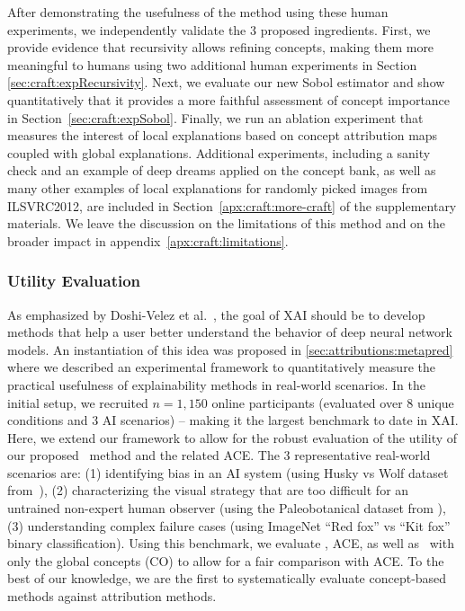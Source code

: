 After demonstrating the usefulness of the method using these human experiments, we independently validate the 3 proposed ingredients.
First, we provide evidence that recursivity allows refining concepts, making them more meaningful to humans using two additional human experiments in Section \ref{sec:craft:expRecursivity}.
Next, we evaluate our new Sobol estimator and show quantitatively that it provides a more faithful assessment of concept importance in Section~\ref{sec:craft:expSobol}.
Finally, we run an ablation experiment that measures the interest of local explanations based on concept attribution maps coupled with global explanations.
Additional experiments, including a sanity check and an example of deep dreams applied on the concept bank, as well as many other examples of local explanations for randomly picked images from ILSVRC2012, are included in Section~\ref{apx:craft:more-craft} of the supplementary materials.
We leave the discussion on the limitations of this method and on the broader impact in appendix~\ref{apx:craft:limitations}.

\subsubsection{Utility Evaluation}
\label{sec:craft:expUtility}


As emphasized by Doshi-Velez et al.~\cite{doshivelez2017rigorous}, the goal of XAI should be to develop methods that help a user better understand the behavior of deep neural network models. An instantiation of this idea was proposed in \autoref{sec:attributions:metapred} where we described an experimental framework to quantitatively measure the practical usefulness of explainability methods in real-world scenarios. In the initial setup, we recruited  $n=1,150$ online participants (evaluated over 8 unique conditions and 3 AI scenarios) -- making it the largest benchmark to date in XAI. Here, we extend our framework to allow for the robust evaluation of the utility of our proposed \craft~method and the related ACE.
The 3 representative real-world scenarios are: (1) identifying bias in an AI system (using Husky vs Wolf dataset from~\cite{ribeiro2016lime}), (2) characterizing the visual strategy that are too difficult for an untrained non-expert human observer (using  the Paleobotanical dataset from \cite{wilf2016computer}), (3) understanding complex failure cases (using ImageNet ``Red fox'' vs ``Kit fox'' binary classification).
Using this benchmark, we evaluate \craft, ACE, as well as \craft~with only the global concepts (\craft CO) to allow for a fair comparison with ACE.
To the best of our knowledge, we are the first to systematically evaluate concept-based methods against attribution methods.

